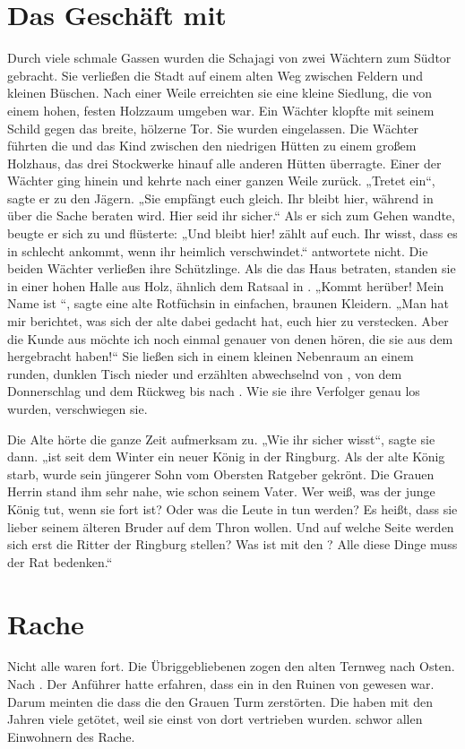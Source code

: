 \begin{huge}
\section{Das Geschäft mit \Lobarn}
Durch viele schmale Gassen wurden die Schajagi von zwei Wächtern zum Südtor gebracht. Sie verließen die Stadt auf einem alten Weg zwischen Feldern und kleinen Büschen. Nach einer Weile erreichten sie eine kleine Siedlung, die von einem hohen, festen Holzzaum umgeben war. Ein Wächter klopfte mit seinem Schild gegen das breite, hölzerne Tor. Sie wurden eingelassen. Die Wächter führten die \Schattenjager und das Kind zwischen den niedrigen Hütten zu einem großem Holzhaus, das drei Stockwerke hinauf alle anderen Hütten überragte. Einer der Wächter ging hinein und kehrte nach einer ganzen Weile zurück.
„Tretet ein“, sagte er zu den Jägern. „Sie empfängt euch gleich. Ihr bleibt hier, während in \Lobarn über die Sache beraten wird. Hier seid ihr sicher.“ Als er sich zum Gehen wandte, beugte er sich zu \Eno und flüsterte: „Und bleibt hier! \Vester zählt auf euch. Ihr wisst, dass es in \Lobarn schlecht ankommt, wenn ihr heimlich verschwindet.“
\Eno antwortete nicht. Die beiden Wächter verließen ihre Schützlinge.
Als die \Schattenjager das Haus betraten, standen sie in einer hohen Halle aus Holz, ähnlich dem Ratsaal in \Lobarn.
„Kommt herüber! Mein Name ist \Naimo “, sagte eine alte Rotfüchsin in einfachen, braunen Kleidern. „Man hat mir berichtet, was sich der alte \Vester dabei gedacht hat, euch hier zu verstecken. Aber die Kunde aus \Tern möchte ich noch einmal genauer von denen hören, die sie aus dem \Enland hergebracht haben!“
Sie ließen sich in einem kleinen Nebenraum an einem runden, dunklen Tisch nieder und erzählten abwechselnd von \Tern, von dem Donnerschlag und dem Rückweg bis nach \Lobarn. Wie sie ihre Verfolger genau los wurden, verschwiegen sie.

Die Alte hörte die ganze Zeit aufmerksam zu.
„Wie ihr sicher wisst“, sagte sie dann. „ist seit dem Winter ein neuer König in der Ringburg. Als der alte König starb, wurde sein jüngerer Sohn vom Obersten Ratgeber gekrönt. Die Grauen Herrin stand ihm sehr nahe, wie schon seinem Vater. Wer weiß, was der junge König tut, wenn sie fort ist? Oder was die Leute in \Rhin tun werden? Es heißt, dass sie lieber seinem älteren Bruder auf dem Thron wollen. Und auf welche Seite werden sich erst die Ritter der Ringburg stellen? Was ist mit den \Bangiri? Alle diese Dinge muss der Rat bedenken.“  

\section{ Rache}
Nicht alle \Bangiri waren fort. Die Übriggebliebenen zogen den alten Ternweg nach Osten. Nach \Lobarn. Der Anführer \Pato hatte erfahren, dass ein \Schattenjager in den Ruinen von \Tern gewesen war. Darum meinten die \Bangiri{,} dass die \Schattenjager den Grauen Turm zerstörten. Die \Schattenjager haben mit den Jahren viele \Bangiri getötet, weil sie einst von dort vertrieben wurden. \Pato schwor allen Einwohnern des  Rache.


\end{huge}
